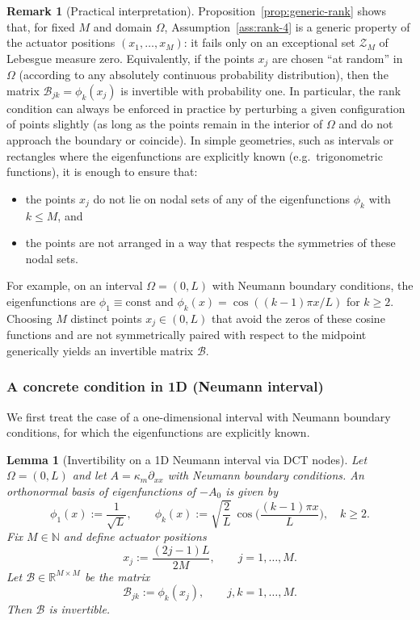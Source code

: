 \documentclass[11pt,a4paper]{article}
\numberwithin{equation}{section}
\newtheorem{lemma}[theorem]{Lemma}
\theoremstyle{definition}
\newtheorem{remark}[theorem]{Remark}
\newcommand{\1}{\mathbbm{1}}
\begin{document}
\begin{remark}[Practical interpretation]
\label{rem:practical-rank}
Proposition~\ref{prop:generic-rank} shows that, for fixed $M$ and domain
$\Omega$, Assumption~\ref{ass:rank-4} is a generic property of the actuator
positions $(x_1,\dots,x_M)$: it fails only on an exceptional set
$\mathcal{Z}_M$ of Lebesgue measure zero. Equivalently, if the points
$x_j$ are chosen ``at random'' in $\Omega$ (according to any absolutely
continuous probability distribution), then the matrix
$\mathcal{B}_{jk}=\phi_k(x_j)$ is invertible with probability one.
\newline
In particular, the rank condition can always be enforced in practice by
perturbing a given configuration of points slightly (as long as the points
remain in the interior of $\Omega$ and do not approach the boundary or
coincide). In simple geometries, such as intervals or rectangles where the
eigenfunctions are explicitly known (e.g.\ trigonometric functions), it is
enough to ensure that:
\begin{itemize}
\item the points $x_j$ do not lie on nodal sets of any of the eigenfunctions
$\phi_k$ with $k\le M$, and
\item the points are not arranged in a way that respects the symmetries of
these nodal sets.
\end{itemize}
For example, on an interval $\Omega=(0,L)$ with Neumann boundary conditions,
the eigenfunctions are $\phi_1\equiv \mathrm{const}$ and
$\phi_k(x)=\cos((k-1)\pi x/L)$ for $k\ge2$. Choosing $M$ distinct points
$x_j\in(0,L)$ that avoid the zeros of these cosine functions and are not
symmetrically paired with respect to the midpoint generically yields an
invertible matrix $\mathcal{B}$.
\end{remark}
\subsubsection*{A concrete condition in 1D (Neumann interval)}
\noindent
We first treat the case of a one-dimensional interval with Neumann boundary
conditions, for which the eigenfunctions are explicitly known.

\begin{lemma}[Invertibility on a 1D Neumann interval via DCT nodes]
\label{lem:rank-1D}
Let $\Omega=(0,L)$ and let $A=\kappa_m\partial_{xx}$ with Neumann boundary
conditions. An orthonormal basis of eigenfunctions of $-A_0$ is given by
\[
\phi_1(x) := \frac{1}{\sqrt{L}},\qquad
\phi_k(x) := \sqrt{\frac{2}{L}}\,\cos\!\Big(\frac{(k-1)\pi x}{L}\Big),
\quad k\ge2.
\]
Fix $M\in\mathbb{N}$ and define actuator positions
\begin{equation}
\label{eq:1D-nodes}
x_j := \frac{(2j-1)L}{2M},\qquad j=1,\dots,M.
\end{equation}
Let $\mathcal{B}\in\mathbb{R}^{M\times M}$ be the matrix
\[
\mathcal{B}_{jk} := \phi_k(x_j),\qquad j,k=1,\dots,M.
\]
Then $\mathcal{B}$ is invertible.
\end{lemma}
\end{document}
